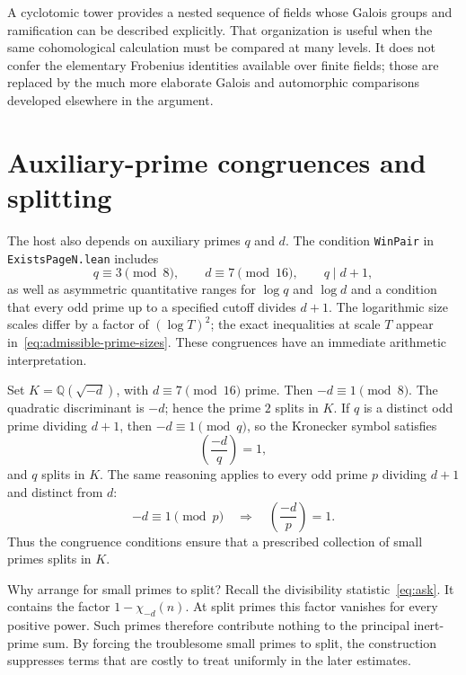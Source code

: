 \documentclass[11pt,openany,oneside]{scrbook}
\theoremstyle{definition}
\theoremstyle{remark}
\newcommand{\QQ}{\mathbb Q}
\begin{document}
A cyclotomic tower provides a nested sequence of fields whose Galois groups and ramification can be described explicitly. That organization is useful when the same cohomological calculation must be compared at many levels. It does not confer the elementary Frobenius identities available over finite fields; those are replaced by the much more elaborate Galois and automorphic comparisons developed elsewhere in the argument.

\section{Auxiliary-prime congruences and splitting}

The host also depends on auxiliary primes $q$ and $d$. The condition \texttt{WinPair} in \texttt{ExistsPageN.lean} includes
\begin{equation}\label{eq:auxprimes}
q\equiv3\pmod8,\qquad d\equiv7\pmod{16},\qquad q\mid d+1,
\end{equation}
as well as asymmetric quantitative ranges for $\log q$ and $\log d$ and a condition that every odd prime up to a specified cutoff divides $d+1$. The logarithmic size scales differ by a factor of $(\log T)^2$; the exact inequalities at scale $T$ appear in~\eqref{eq:admissible-prime-sizes}. These congruences have an immediate arithmetic interpretation.

Set $K=\QQ(\sqrt{-d})$, with $d\equiv7\pmod{16}$ prime. Then $-d\equiv1\pmod8$. The quadratic discriminant is $-d$; hence the prime $2$ splits in $K$. If $q$ is a distinct odd prime dividing $d+1$, then $-d\equiv1\pmod q$, so the Kronecker symbol satisfies
\[
\left(\frac{-d}{q}\right)=1,
\]
and $q$ splits in $K$. The same reasoning applies to every odd prime $p$ dividing $d+1$ and distinct from $d$:
\[
-d\equiv1\pmod p\quad\Longrightarrow\quad
\left(\frac{-d}{p}\right)=1.
\]
Thus the congruence conditions ensure that a prescribed collection of small primes splits in $K$.

Why arrange for small primes to split? Recall the divisibility statistic~\eqref{eq:ask}. It contains the factor $1-\chi_{-d}(n)$. At split primes this factor vanishes for every positive power. Such primes therefore contribute nothing to the principal inert-prime sum. By forcing the troublesome small primes to split, the construction suppresses terms that are costly to treat uniformly in the later estimates.
\end{document}
